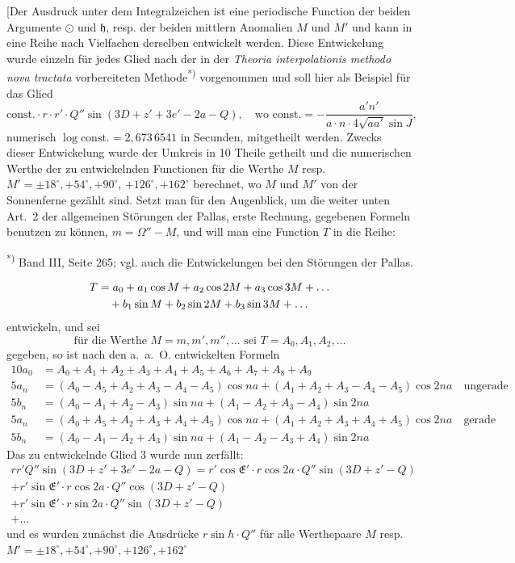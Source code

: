 \documentclass[12pt,a4paper]{article}
\newcommand{\Ceres}{\odot}
\newcommand{\Jupiter}{\mathfrak{h}}
\begin{document}
[Der Ausdruck unter dem Integralzeichen ist eine periodische Function der beiden Argumente $\Ceres$ und $\Jupiter$, resp. der beiden mittlern Anomalien $M$ und $M'$ und kann in eine Reihe nach Vielfachen derselben entwickelt werden. Diese Entwickelung wurde einzeln für jedes Glied nach der in der \textit{Theoria interpolationis methodo nova tractata} vorbereiteten Methode\textsuperscript{*)} vorgenommen und soll hier als Beispiel für das Glied
\begin{equation}
\text{const.} \cdot r \cdot r' \cdot Q'' \sin(3D + z' + 3e' - 2a - Q), \quad \text{wo const.} = -\frac{a' n'}{a \cdot n \cdot 4\sqrt{aa'} \sin J},
\end{equation}
numerisch $\log \text{const.} = 2{,}673\,6541$ in Secunden,
mitgetheilt werden. Zwecks dieser Entwickelung wurde der Umkreis in 10 Theile getheilt und die numerischen Werthe der zu entwickelnden Functionen für die Werthe $M$ resp. $M' = \pm18^\circ, +54^\circ, +90^\circ$, $+126^\circ, +162^\circ$ berechnet, wo $M$ und $M'$ von der Sonnenferne gezählt sind. Setzt man für den Augenblick, um die weiter unten Art.~2 der allgemeinen Störungen der Pallas, erste Rechnung, gegebenen Formeln benutzen zu können, $m = \Omega'' - M$, und will man eine Function $T$ in die Reihe:

\smallskip\noindent\textsuperscript{*)} Band III, Seite 265; vgl. auch die Entwickelungen bei den Störungen der Pallas.

\newpage
\setcounter{page}{414}
%
\begin{align}
T &= a_0 + a_1 \cos M + a_2 \cos 2M + a_3 \cos 3M + \ldots\\
&\quad + b_1 \sin M + b_2 \sin 2M + b_3 \sin 3M + \ldots\notag
\end{align}
entwickeln, und sei
\[\text{für die Werthe } M = m, m', m'', \ldots \text{ sei } T = A_0, A_1, A_2, \ldots\]
gegeben, so ist nach den a.~a.~O. entwickelten Formeln
\begin{align}
10a_0 &= A_0 + A_1 + A_2 + A_3 + A_4 + A_5 + A_6 + A_7 + A_8 + A_9\\
5a_n &= (A_0 - A_5 + A_2 + A_3 - A_4 - A_5) \cos na + (A_1 + A_2 + A_3 - A_4 - A_5) \cos 2na \quad \text{ungerade}\\
5b_n &= (A_0 - A_1 + A_2 - A_3) \sin na + (A_1 - A_2 + A_3 - A_4) \sin 2na\\
5a_n &= (A_0 + A_5 + A_2 + A_3 + A_4 + A_5) \cos na + (A_1 + A_2 + A_3 + A_4 + A_5) \cos 2na \quad \text{gerade}\\
5b_n &= (A_0 - A_1 - A_2 + A_3) \sin na + (A_1 - A_2 - A_3 + A_4) \sin 2na
\end{align}
Das zu entwickelnde Glied 3 wurde nun zerfällt:
\begin{multline}
rr'Q'' \sin(3D + z' + 3e' - 2a - Q) = r'\cos \mathfrak{E}' \cdot r\cos 2a \cdot Q'' \sin(3D + z' - Q)\\
+ r'\sin \mathfrak{E}' \cdot r\cos 2a \cdot Q'' \cos(3D + z' - Q)\\
+ r'\sin \mathfrak{E}' \cdot r\sin 2a \cdot Q'' \sin(3D + z' - Q)\\
+ \ldots
\end{multline}
und es wurden zunächst die Ausdrücke $r \sin h \cdot Q''$ für alle Werthepaare $M$ resp. $M' = \pm18^\circ, +54^\circ, +90^\circ, +126^\circ, +162^\circ$
\end{document}
